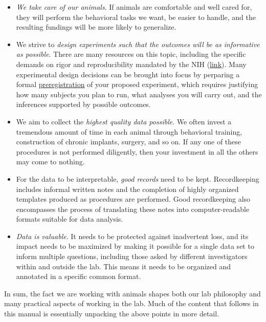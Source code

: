 \documentclass{tufte-book}
\begin{document}
\begin{itemize}

\item{{\it We take care of our animals}. If animals are comfortable and well
  cared for, they will perform the behavioral tasks we want, be easier
  to handle, and the resulting fundings will be more likely to generalize.}

\item{We strive to {\it design experiments such that the outcomes will
    be as informative as possible}. There are many resources on this
  topic, including the specific demands on rigor and reproducibility
  mandated by the NIH
  (\href{https://grants.nih.gov/policy/reproducibility/index.htm}{link}). Many
  experimental design decisions can be brought into focus by perparing
  a formal \href{https://cos.io/prereg/}{preregistration} of your
  proposed experiment, which requires justifying how many subjects you
  plan to run, what analyses you will carry out, and the inferences
  supported by possible outcomes.}

\item{We aim to collect the {\it highest quality data possible}. We
  often invest a tremendous amount of time in each animal through
  behavioral training, construction of chronic implants, surgery, and
  so on. If any one of these procedures is not performed diligently,
  then your investment in all the others may come to nothing.}

\item{For the data to be interpretable, {\it good records} need to be
  kept. Recordkeeping includes informal written notes and the
  completion of highly organized templates produced as procedures are
  performed. Good recordkeeping also encompasses the process of
  translating these notes into computer-readable formats suitable for
  data analysis.}

\item{{\it Data is valuable}. It needs to be protected against inadvertent
  loss, and its impact needs to be maximized by making it possible for
  a single data set to inform multiple questions, including those
  asked by different investigators within and outside the lab. This
  means it needs to be organized and annotated in a specific common
  format.}
\end{itemize}

In sum, the fact we are working with animals shapes both our lab
philosophy and many practical aspects of working in the lab. Much of
the content that follows in this manual is essentially unpacking the
above points in more detail.
\end{document}
